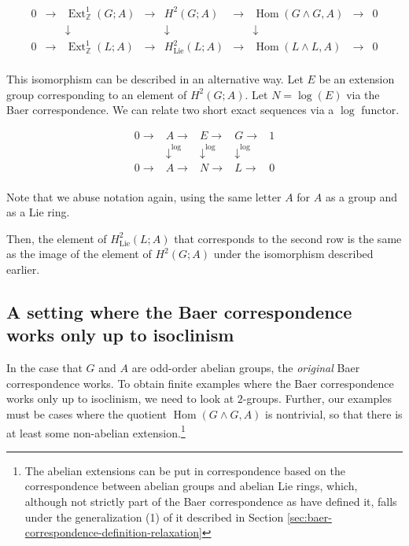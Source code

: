 \documentclass[10pt]{amsart}
\begin{document}
$$\begin{array}{ccccccccc}
  0 &\to &\operatorname{Ext}^1_{\mathbb{Z}}(G;A) &\to &H^2(G;A) &\to &\operatorname{Hom}(G \wedge G,A) &\to &0\\
  & & \downarrow & & \downarrow & & \downarrow & & \\
  0 &\to &\operatorname{Ext}^1_{\mathbb{Z}}(L;A) & \to & H^2_{\text{Lie}}(L;A) & \to & \operatorname{Hom}(L \wedge L, A) & \to & 0\\
\end{array}$$

This isomorphism can be described in an alternative way. Let $E$ be an
extension group corresponding to an element of $H^2(G;A)$. Let $N =
\log(E)$ via the Baer correspondence. We can relate two short exact
sequences via a $\log$ functor.

$$\begin{array}{lllll}
    0 \to & A \to & E \to & G \to & 1 \\
    & \downarrow^{\log} & \downarrow^{\log} & \downarrow^{\log}&  \\
    0  \to & A \to & N \to & L \to & 0\\
\end{array}$$

Note that we abuse notation again, using the same letter $A$ for $A$
as a group and as a Lie ring.

Then, the element of $H^2_{\text{Lie}}(L;A)$ that corresponds to the
second row is the same as the image of the element of $H^2(G;A)$ under
the isomorphism described earlier.

\subsection{A setting where the Baer correspondence works only up to isoclinism}\label{sec:bcuti-ex}

In the case that $G$ and $A$ are odd-order abelian groups, the {\em
  original} Baer correspondence works. To obtain finite examples where
the Baer correspondence works only up to isoclinism, we need to look
at $2$-groups. Further, our examples must be cases where the quotient
$\operatorname{Hom}(G \wedge G,A)$ is nontrivial, so that there is at
least some non-abelian extension.\footnote{The abelian extensions can
  be put in correspondence based on the correspondence between abelian
  groups and abelian Lie rings, which, although not strictly part of
  the Baer correspondence as have defined it, falls under the
  generalization (1) of it described in Section
  \ref{sec:baer-correspondence-definition-relaxation}}
\end{document}
